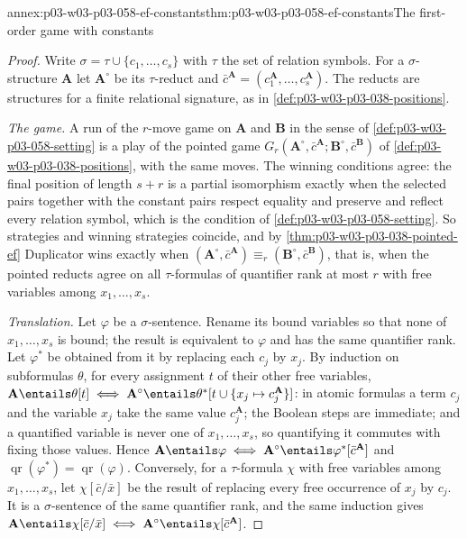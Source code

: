 \begin{annexitem}{annex:p03-w03-p03-058-ef-constants}{thm:p03-w03-p03-058-ef-constants}{The first-order game with constants}
\begin{proof}
Write \(\sigma=\tau\cup\{c_1,\ldots,c_s\}\) with \(\tau\) the set of
relation symbols. For a \(\sigma\)-structure \(\mathbf A\) let
\(\mathbf A^\circ\) be its \(\tau\)-reduct and
\(\bar c^{\mathbf A}=(c_1^{\mathbf A},\ldots,c_s^{\mathbf A})\). The
reducts are structures for a finite relational signature, as in
\cref{def:p03-w03-p03-038-positions}.

\emph{The game.} A run of the \(r\)-move game on \(\mathbf A\) and
\(\mathbf B\) in the sense of \cref{def:p03-w03-p03-058-setting} is a play
of the pointed game
\(G_r(\mathbf A^\circ,\bar c^{\mathbf A};\mathbf B^\circ,\bar
c^{\mathbf B})\) of \cref{def:p03-w03-p03-038-positions}, with the same
moves. The winning conditions agree: the final position of length \(s+r\)
is a partial isomorphism exactly when the selected pairs together with the
constant pairs respect equality and preserve and reflect every relation
symbol, which is the condition of \cref{def:p03-w03-p03-058-setting}. So
strategies and winning strategies coincide, and by
\cref{thm:p03-w03-p03-038-pointed-ef} Duplicator wins exactly when
\((\mathbf A^\circ,\bar c^{\mathbf A})\equiv_r(\mathbf B^\circ,\bar
c^{\mathbf B})\), that is, when the pointed reducts agree on all
\(\tau\)-formulas of quantifier rank at most \(r\) with free variables
among \(x_1,\ldots,x_s\).

\emph{Translation.} Let \(\varphi\) be a \(\sigma\)-sentence. Rename its
bound variables so that none of \(x_1,\ldots,x_s\) is bound; the result is
equivalent to \(\varphi\) and has the same quantifier rank. Let
\(\varphi^*\) be obtained from it by replacing each \(c_j\) by \(x_j\). By
induction on subformulas \(\theta\), for every assignment \(t\) of their
other free variables,
\(\mathbf A\entails\theta[t]\iff\mathbf A^\circ\entails\theta^*[t\cup
\{x_j\mapsto c_j^{\mathbf A}\}]\): in atomic formulas a term \(c_j\) and the
variable \(x_j\) take the same value \(c_j^{\mathbf A}\); the Boolean steps
are immediate; and a quantified variable is never one of
\(x_1,\ldots,x_s\), so quantifying it commutes with fixing those values.
Hence \(\mathbf A\entails\varphi\iff\mathbf A^\circ\entails\varphi^*
[\bar c^{\mathbf A}]\) and \(\operatorname{qr}(\varphi^*)=
\operatorname{qr}(\varphi)\). Conversely, for a \(\tau\)-formula \(\chi\)
with free variables among \(x_1,\ldots,x_s\), let \(\chi[\bar c/\bar x]\) be
the result of replacing every free occurrence of \(x_j\) by \(c_j\). It is a
\(\sigma\)-sentence of the same quantifier rank, and the same induction
gives \(\mathbf A\entails\chi[\bar c/\bar x]\iff\mathbf A^\circ\entails
\chi[\bar c^{\mathbf A}]\).


\end{proof}
\end{annexitem}
